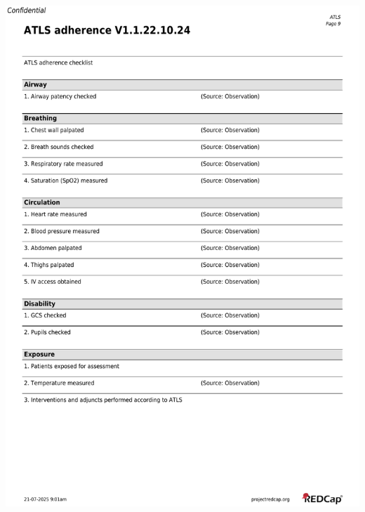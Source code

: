 \documentclass[
]{scrartcl}
\begin{document}
\includegraphics{../case-record-form/instrument-pdfs/pages/all-instruments-9.pdf}
\end{document}

